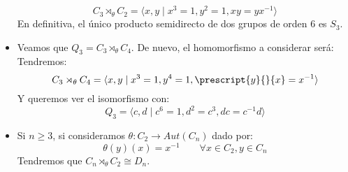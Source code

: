 \begin{ejemplo}
\begin{itemize}
\begin{equation*}
                C_3 \rtimes_\theta C_2 = \langle x,y\mid x^3=1, y^2 = 1, xy = yx^{-1} \rangle 
            \end{equation*}
            En definitiva, el único producto semidirecto de dos grupos de orden 6 es $S_3$.
        \item Veamos que $Q_3 = C_3\rtimes_\theta C_4$. De nuevo, el homomorfismo a considerar será:
            Tendremos:
            \begin{equation*}
                C_3\rtimes_\theta C_4 = \langle x,y\mid x^3=1, y^4 = 1, \prescript{y}{}{x}= x^{-1} \rangle 
            \end{equation*}
            Y queremos ver el isomorfismo con:
            \begin{equation*}
                Q_3 = \langle c,d\mid c^6=1, d^2 = c^3, dc=c^{-1}d \rangle 
            \end{equation*}
        \item Si $n\geq 3$, si consideramos $\theta:C_2\to Aut(C_n)$ dado por:
            \begin{equation*}
                \theta(y)(x) = x^{-1} \qquad \forall x\in C_2, y\in C_n
            \end{equation*}
            Tendremos que $C_n\rtimes_\theta C_2 \cong D_n$.
    \end{itemize}
\end{ejemplo}

